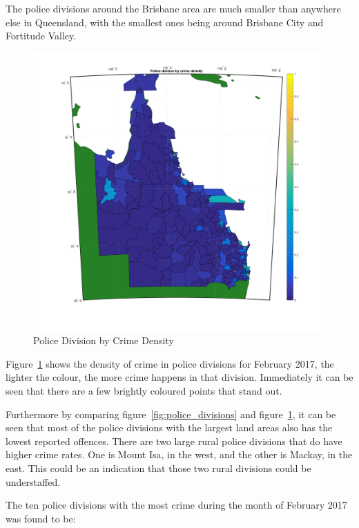 \documentclass[]{article}
\begin{document}
The police divisions around the Brisbane area are much smaller than anywhere else in Queensland, with the smallest ones being around Brisbane City and Fortitude Valley.

\begin{figure}[H]
    \caption{Police Division by Crime Density}
    \centering
    \label{fig:crime_density}
    \includegraphics[width=\linewidth]{../images/police_division_by_crime_density}
\end{figure}

Figure~\ref{fig:crime_density} shows the density of crime in police divisions for February 2017, the lighter the colour, the more crime happens in that division.
Immediately it can be seen that there are a few brightly coloured points that stand out.

Furthermore by comparing figure~\ref{fig:police_divisions} and figure~\ref{fig:crime_density}, it can be seen that most of the police divisions with the largest land areas also has the lowest reported offences.
There are two large rural police divisions that do have higher crime rates. One is Mount Isa, in the west, and the other is Mackay, in the east. This could be an indication that those two rural divisions could be understaffed.

The ten police divisions with the most crime during the month of February 2017 was found to be:
\end{document}
